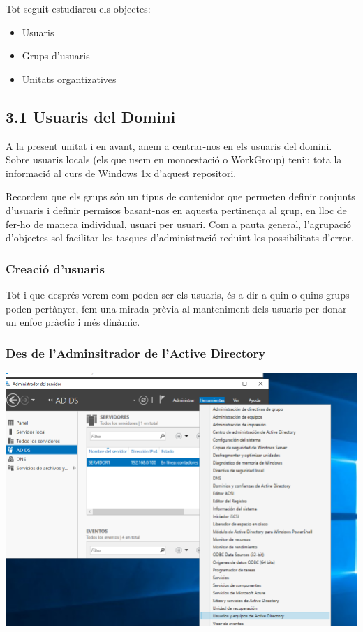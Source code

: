 \documentclass[
  a4paper,
]{article}
\providecommand{\tightlist}{%
  \setlength{\itemsep}{0pt}\setlength{\parskip}{0pt}}
\begin{document}
Tot seguit estudiareu els objectes:

\begin{itemize}
\tightlist
\item
  Usuaris
\item
  Grups d'usuaris
\item
  Unitats organtizatives
\end{itemize}

\subsection{3.1 Usuaris del Domini}\label{usuaris-del-domini}

A la present unitat i en avant, anem a centrar-nos en els usuaris del
domini. Sobre usuaris locals (els que usem en monoestació o WorkGroup)
teniu tota la informació al curs de Windows 1x d'aquest repositori.

Recordem que els grups són un tipus de contenidor que permeten definir
conjunts d'usuaris i definir permisos basant-nos en aquesta pertinença
al grup, en lloc de fer-ho de manera individual, usuari per usuari. Com
a pauta general, l'agrupació d'objectes sol facilitar les tasques
d'administració reduint les possibilitats d'error.

\subsubsection{Creació d'usuaris}\label{creaciuxf3-dusuaris}

Tot i que després vorem com poden ser els usuaris, és a dir a quin o
quins grups poden pertànyer, fem una mirada prèvia al manteniment dels
usuaris per donar un enfoc pràctic i més dinàmic.

\subsubsection{Des de l'Adminsitrador de l'Active
Directory}\label{des-de-ladminsitrador-de-lactive-directory}

\includegraphics{png/usuaris1.png}
\end{document}
